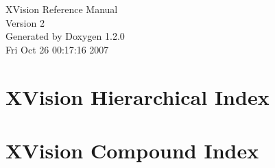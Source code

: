 \documentclass[letterpaper,ps2pdf]{book}
\begin{document}
\begin{titlepage}
\vspace*{7cm}
\begin{center}
{\Large XVision Reference Manual\\[1ex]\large Version 2}\\
\vspace*{1cm}
{\large Generated by Doxygen 1.2.0}\\
\vspace*{0.5cm}
{\small Fri Oct 26 00:17:16 2007}\\
\end{center}
\end{titlepage}
\clearemptydoublepage
{}
\tableofcontents
\clearemptydoublepage
{}
\chapter{XVision Hierarchical Index}

\chapter{XVision Compound Index}

\end{document}
